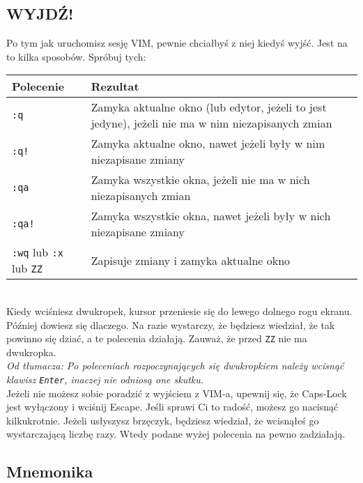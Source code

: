 \documentclass[a4paper,12pt]{article}
\begin{document}
\subsection{WYJDŹ!}

Po tym jak uruchomisz sesję VIM, pewnie chciałbyś z niej kiedyś wyjść. Jest na to kilka sposobów. Spróbuj tych:

\begin{tabular}{ l | p{9cm} }
{\bf Polecenie} & {\bf Rezultat} \\ \hline
{\tt :q} & \small{Zamyka aktualne okno (lub edytor, jeżeli to jest jedyne), jeżeli nie ma w nim niezapisanych zmian} \\ 
{\tt :q!} & Zamyka aktualne okno, nawet jeżeli były w nim niezapisane zmiany \\ 
{\tt :qa} & Zamyka wszystkie okna, jeżeli nie ma w nich niezapisanych zmian \\ 
{\tt :qa!} & Zamyka wszystkie okna, nawet jeżeli były w nich niezapisane zmiany \\ 
{\tt :wq} lub {\tt :x} lub {\tt ZZ} & Zapisuje zmiany i zamyka aktualne okno \\ \hline
\end{tabular}\\

\noindent
Kiedy wciśniesz dwukropek, kursor przeniesie się do lewego dolnego rogu ekranu. Później dowiesz się dlaczego. Na razie wystarczy, że będziesz wiedział, że tak powinno się dziać, a te polecenia działają. Zauważ, że przed {\tt ZZ} nie ma dwukropka.\\
{\it Od tłumacza: Po poleceniach rozpoczynających się dwukropkiem należy wcisnąć klawisz \textit{\texttt{Enter}}, inaczej nie odniosą one skutku.}\\
Jeżeli nie możesz sobie poradzić z wyjściem z VIM-a, upewnij się, że Caps-Lock jest wyłączony i wciśnij Escape. Jeśli sprawi Ci to radość, możesz go nacisnąć kilkukrotnie. Jeżeli usłyszysz brzęczyk, będziesz wiedział, że wcisnąłeś go wystarczającą liczbę razy. Wtedy podane wyżej polecenia na pewno zadziałają.
\subsection{Mnemonika}
\end{document}
